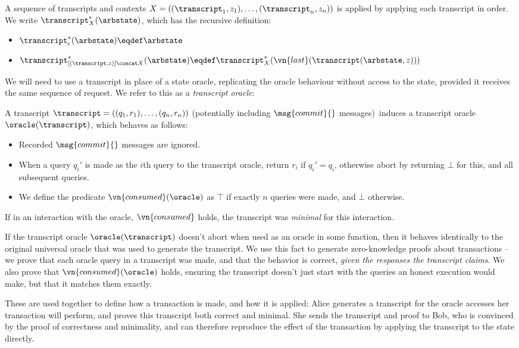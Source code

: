 \begin{definition}
  A sequence of transcripts and contexts $X = ((\transcript_1, z_1), \ldots,
  (\transcript_n, z_n))$ is applied by applying each transcript in order. We write
  $\transcript^*_X(\arbstate)$, which has the recursive definition:
  \begin{itemize}
    \item $\transcript^*_\epsilon(\arbstate) \eqdef \arbstate$
    \item $\transcript^*_{[(\transcript, z)] \concat X}(\arbstate) \eqdef
      \transcript^*_X(\vn{last}(\transcript(\arbstate, z)))$
  \end{itemize}
\end{definition}

We will need to use a transcript in place of a state oracle, replicating the
oracle behaviour without access to the state, provided it receives the same
sequence of request. We refer to this as a \emph{transcript oracle}:

\begin{definition}
  A transcript $\transcript = ((q_1, r_1), \ldots, (q_n, r_n))$
  (potentially including $\msg{commit}{}$ messages)\ induces a
  transcript oracle $\oracle(\transcript)$, which behaves as follows:
  \begin{itemize}
    \item Recorded $\msg{commit}{}$ messages are ignored.
    \item When a query $q_i'$ is made as the $i$th query to the transcript
      oracle, return $r_i$ if $q_i' = q_i$, otherwise abort by returning $\bot$
      for this, and all subsequent queries.
    \item We define the predicate $\vn{consumed}(\oracle)$ as $\top$ if exactly $n$
      queries were made, and $\bot$ otherwise.
  \end{itemize}
  If in an interaction with the oracle, $\vn{consumed}$ holds, the transcript
  was \emph{minimal} for this interaction.
\end{definition}

If the transcript oracle $\oracle(\transcript)$ doesn't abort when used as an
oracle in some function, then it behaves identically to the original universal
oracle that was used to generate the transcript. We use this fact to generate
zero-knowledge proofs about transactions -- we prove that each oracle query in a
transcript was made, and that the behavior is correct, \emph{given the
  responses the transcript claims}. We also prove that $\vn{consumed}(\oracle)$
holds, ensuring the transcript doesn't just start with the queries an honest
execution would make, but that it matches them exactly.

These are used together to define how a transaction is made, and how it is
applied: Alice generates a transcript for the oracle accesses her transaction
will perform, and proves this transcript both correct and minimal. She sends the
transcript and proof to Bob, who is convinced by the proof of correctness and
minimality, and can therefore reproduce the effect of the transaction by
applying the transcript to the state directly.

